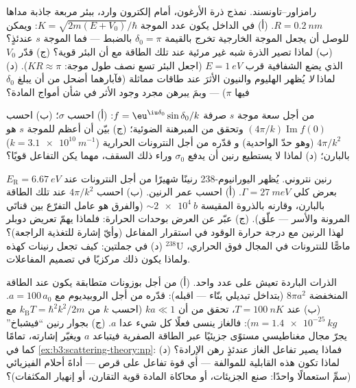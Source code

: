 \begin{exercise}[$\star\star$]\label{exo:b3:scattering-theory:8}
رامزاور--تاونسند. نمذج ذرة الأرغون، أمام إلكترون
وارد، ببئر مربعة جاذبة مداها $R =
\qty{0.2}{nm}$. (أ) في الداخل يكون عدد الموجة $K =
\sqrt{2m(E + V_0)}/\hbar$: ويمكن للوصل أن يجعل الموجة الخارجية
تخرج بالقيمة $\delta_0 = \pi$ بالضبط --- فما  الموجة $s$
عندئذٍ؟ (ب) لماذا تصير الذرة شبه غير مرئية عند تلك
الطاقة مع أن البئر قوية؟ (ج) قدّر $V_0$
الذي يضع الشفافية قرب $E = \qty{1}{eV}$ (اجعل البئر
تسع نصف طول موجة: $KR \approx \pi$). (د) لماذا \emph{لا} يُظهر
الهليوم والنيون الأثرَ عند طاقات مماثلة (فآبارهما أضحل
من أن يبلغ $\delta_0$ فيها $\pi$) --- وبمَ
يبرهن مجرد وجود الأثر في شأن أمواج المادة؟
\end{exercise}

\begin{exercise}[$\star\star$]\label{exo:b3:scattering-theory:9}
من أجل سعة موجة $s$ صرفة $f = \eu^{\iu\delta_0}\sin\delta_0/
k$: (أ) احسب $\sigma$؛ (ب) احسب $(4\pi/k)\operatorname{Im}
f(0)$ وتحقق من المبرهنة الضوئية؛ (ج) بيّن أن أعظم 
للموجة $s$ هو $4\pi/k^2$ (وهو حدّ الواحدية) و
قدّره من أجل النترونات الحرارية ($k = \qty{3.1e10}{m^{-1}}$)
بالبارن؛ (د) لماذا لا يستطيع رنين أن يدفع $\sigma_0$ وراء ذلك
السقف، مهما يكن التفاعل قويًا؟
\end{exercise}

\begin{exercise}[$\star\star\star$]\label{exo:b3:scattering-theory:10}
رنين نتروني. يُظهر اليورانيوم-238 رنينًا شهيرًا من أجل
النترونات عند $E_{\text{R}} = \qty{6.67}{eV}$ بعرض كلي
$\Gamma = \qty{27}{meV}$. (أ) احسب عمر الرنين.
(ب) احسب $4\pi/k^2$ عند تلك الطاقة بالبارن، وقارنه بالذروة
المقيسة $\sim\qty{2e4}{b}$ (والفرق هو عامل التفرّع بين
قناتَي المرونة والأسر --- علّق). (ج) عبّر عن العرض
بوحدات الحرارة: فلماذا يهمّ تعريض دوبلر لهذا الرنين
مع درجة حرارة الوقود في استقرار المفاعل (وأيّ إشارة للتغذية الراجعة)؟ (د) في جملتين:
كيف تجعل رنينات كهذه $^{238}$U ماصًّا للنترونات في المجال
فوق الحراري، ولماذا يكون ذلك مركزيًا في تصميم المفاعلات.
\end{exercise}

\begin{exercise}[$\star\star\star$]\label{exo:b3:scattering-theory:11}
الذرات الباردة تعيش على عدد واحد. (أ) من أجل بوزونات متطابقة يكون
 عند الطاقة المنخفضة $8\pi a^2$ (بتداخل تبديلي
بنّاء --- اقبله): قدّره من أجل الروبيديوم مع $a =
100\,a_0$. (ب) عند $T = \qty{100}{nK}$، تحقق من أن $ka \ll 1$
(احسب $k$ من $k_{\text{B}}T = \hbar^2k^2/2m$ مع $m =
\qty{1.4e-25}{kg}$): فالغاز ينسى فعلًا كل شيء عدا $a$.
(ج) بجوار رنين ``فيشباخ'' يجرّ مجال مغناطيسي مستوًى
جزيئيًا عبر الطاقة الصفرية فيتباعد $a$ ويغيّر
إشارته، تمامًا كما في \cref{ex:b3:scattering-theory:np}: فماذا
يصير تفاعل الغاز عندئذٍ رهن الإرادة؟ (د) لماذا تكون هذه
القابلية للموالفة --- أي قوة تفاعل على قرص --- أداةَ أحلام
الفيزيائي (سمِّ استعمالًا واحدًا: صنع الجزيئات، أو محاكاة
المادة قوية التقارن، أو إنهيار المكثفات)؟
\end{exercise}

